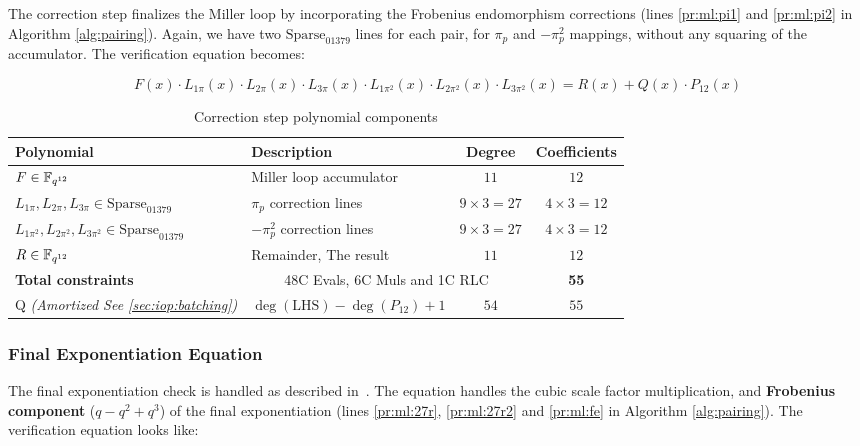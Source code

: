 The correction step finalizes the Miller loop by incorporating the Frobenius endomorphism corrections (lines \ref{pr:ml:pi1} and \ref{pr:ml:pi2} in Algorithm \ref{alg:pairing}). Again, we have two $\text{Sparse}_{01379}$ lines for each pair, for $\pi_p$ and $-\pi_p^2$ mappings, without any squaring of the accumulator. The verification equation becomes:

\begin{equation}\label{eq:op:fm}
F(x) \cdot L_{1\pi}(x) \cdot L_{2\pi}(x) \cdot L_{3\pi}(x) \cdot L_{1\pi^2}(x) \cdot L_{2\pi^2}(x) \cdot L_{3\pi^2}(x) = R(x) + Q(x) \cdot P_{12}(x)
\end{equation}

\begin{table}[h]
\centering
\begin{tabular}{|l|l|c|c|}
\hline
\textbf{Polynomial} & \textbf{Description} & \textbf{Degree} & \textbf{Coefficients} \\
\hline
$F \in \mathbb{F}_{q^{12}}$ & Miller loop accumulator & $11$ & $12$ \\
\hline
$L_{1\pi}, L_{2\pi}, L_{3\pi} \in \text{Sparse}_{01379}$ & $\pi_p$ correction lines & $9 \times 3 = 27$ & $4 \times 3 = 12$ \\
\hline
$L_{1\pi^2}, L_{2\pi^2}, L_{3\pi^2} \in \text{Sparse}_{01379}$ & $-\pi_p^2$ correction lines & $9 \times 3 = 27$ & $4 \times 3 = 12$ \\
\hline
$R \in \mathbb{F}_{q^{12}}$ & Remainder, The result & $11$ & $12$ \\
\hline
\textbf{Total constraints} & \multicolumn{2}{|c|}{48C Evals, 6C Muls and 1C RLC} & \textbf{55} \\
\hline
Q \textit{(Amortized See \ref{sec:iop:batching})} & $\deg(\text{LHS}) - \deg(P_{12}) + 1$ & $54$ & $55$ \\
\hline
\end{tabular}
\caption{Correction step polynomial components}\label{tbl:op:ml-frob}
\end{table}

\subsubsection{Final Exponentiation Equation}\label{sec:op:finx}

The final exponentiation check is handled as described in~\cite{EPRINT:NovEag24}. The equation handles the cubic scale factor multiplication, and \textbf{Frobenius component} ($q - q^2 + q^3$) of the final exponentiation (lines \ref{pr:ml:27r}, \ref{pr:ml:27r2} and \ref{pr:ml:fe} in Algorithm \ref{alg:pairing}). The verification equation looks like:

